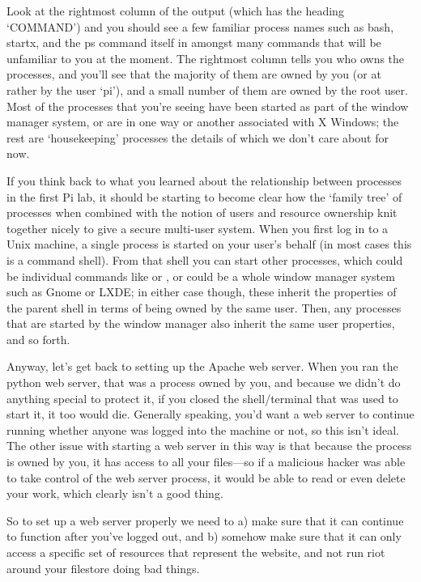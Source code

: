 Look at the rightmost column of the output (which has the heading `COMMAND') and you should see a few familiar process names such as bash, startx, and the ps command itself in amongst many commands that will be unfamiliar to you at the moment. The rightmost column tells you who owns the processes, and you'll see that the majority of them are owned by you (or at rather by the user `pi'), and a small number of them are owned by the root user. Most of the processes that you're seeing have been started as part of the window manager system, or are in one way or another associated with X Windows; the rest are `housekeeping' processes the details of which we don't care about for now. 

If you think back to what you learned about the relationship between processes in the first Pi lab, it should be starting to become clear how the `family tree' of processes when combined with the notion of users and resource ownership knit together nicely to give a secure multi-user system. When you first log in to a Unix machine, a single process is started on your user's behalf (in most cases this is a command shell). From that shell you can start other processes, which could be individual commands like  or , or could be a whole window manager system such as Gnome or LXDE; in either case though, these inherit the properties of the parent shell in terms of being owned by the same user. Then, any processes that are started by the window manager also inherit the same user properties, and so forth. 

Anyway, let's get back to setting up the Apache web server. When you ran the python web server, that was a process owned by you, and because we didn't do anything special to protect it, if you closed the shell/terminal that was used to start it, it too would die. Generally speaking, you'd want a web server to continue running whether anyone was logged into the machine or not, so this isn't ideal. The other issue with starting a web server in this way is that because the process is owned by you, it has access to all your files---so if a malicious hacker was able to take control of the web server process, it would be able to read or even delete your work, which clearly isn't a good thing. 

So to set up a web server properly we need to a) make sure that it can continue to function after you've logged out, and b) somehow make sure that it can only access a specific set of resources that represent the website, and not run riot around your filestore doing bad things. 

